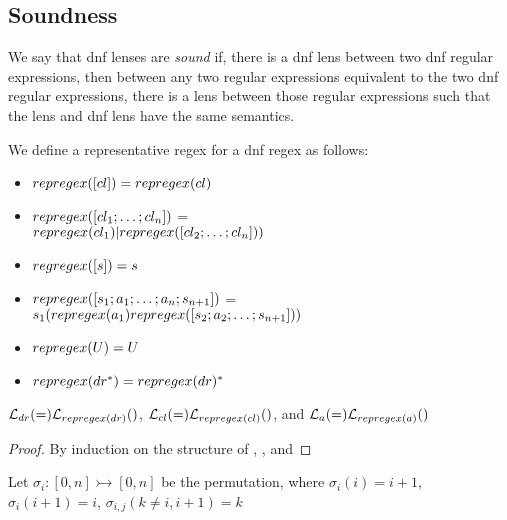 \subsection{Soundness}
We say that dnf lenses are \textit{sound} if, there is a dnf lens between two
dnf regular expressions, then between any two regular expressions equivalent
to the two dnf regular expressions, there is a lens between those regular
expressions such that the lens and dnf lens have the same semantics.

\begin{definition}[repregex]
We define a representative regex for a dnf regex as follows:
\begin{itemize}
\item $repregex([cl])=repregex(cl)$
\item $repregex([cl_1 ; \ldots ; cl_n])$ =\\ $repregex(cl_1)| repregex([cl_2 ; \ldots ; cl_n]))$
\item $regregex([s]) = s$
\item $repregex([s_1 ; a_1 ; \ldots ; a_n ; s_{n+1}])$ =\\ $s_1 (repregex(a_1) repregex([s_2 ; a_2 ; \ldots ; s_{n+1}]))$
\item $repregex(U) = U$
\item $repregex(dr^*) = repregex(dr)^*$
\end{itemize}
\end{definition}

\begin{lemma}
$\LanguageOf{\DNFRegex}=\LanguageOf{repregex(\DNFRegex)}$,
$\LanguageOf{\Clause} = \LanguageOf{repregex(\Clause)}$,
and $\LanguageOf{\Atom} = \LanguageOf{repregex(\Atom)}$
\begin{proof}
By induction on the structure of \DNFRegex, \Clause, and \Atom
\end{proof}
\end{lemma}

\begin{definition}
Let $\sigma_{i} : [0,n] \rightarrowtail [0,n]$ be the permutation, where
$\sigma_{i}(i) = i+1$, $\sigma_{i}(i+1) = i$, $\sigma_{i,j}(k\neq i,i+1) = k$
\end{definition}

